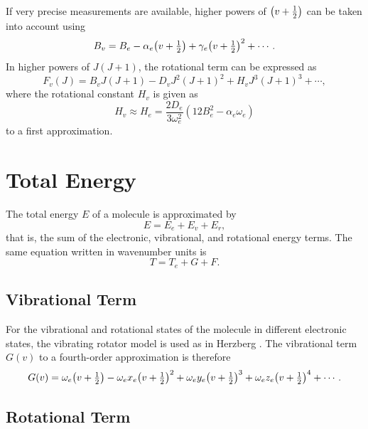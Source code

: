 \documentclass[11pt, twoside, fleqn]{report}
\DeclareRobustCommand\_{\ifmmode\expandafter\subtxt\else\textunderscore\fi}
\DeclarePairedDelimiter\p{\lparen}{\rparen}
\begin{document}
If very precise measurements are available, higher powers of $\p*{v + \tfrac{1}{2}}$ can be taken into account using
\begin{equation*}
    B_v = B_e - \alpha_e\p*{v + \tfrac{1}{2}} + \gamma_e\p*{v + \tfrac{1}{2}}^2 + \dotsb.
\end{equation*}
In higher powers of $J(J + 1)$, the rotational term can be expressed as
\begin{equation*}
    F_v(J) = B_vJ(J + 1) - D_vJ^2(J + 1)^2 + H_vJ^3(J + 1)^3 + \dotsb,
\end{equation*}
where the rotational constant $H_v$ is given as
\begin{equation*}
    H_v \approx H_e = \frac{2D_e}{3\omega_e^2}(12B_e^2 - \alpha_e\omega_e)
\end{equation*}
to a first approximation.

\chapter{Total Energy}
\label{c:total_energy}

The total energy $E$ of a molecule is approximated by
\begin{equation*}
    E = E_e + E_v + E_r,
\end{equation*}
that is, the sum of the electronic, vibrational, and rotational energy terms. The same equation written in wavenumber units is
\begin{equation}
    T = T_e + G + F.
\end{equation}

\section{Vibrational Term}
\label{s:vibrational_term}

For the vibrational and rotational states of the molecule in different electronic states, the vibrating rotator model is used as in Herzberg \cite{herzberg:spectra}. The vibrational term $G(v)$ to a fourth-order approximation is therefore
\begin{equation}
    G(v) = \omega_e\p*{v + \tfrac{1}{2}} - \omega_ex_e\p*{v + \tfrac{1}{2}}^2 + \omega_ey_e\p*{v + \tfrac{1}{2}}^3 + \omega_ez_e\p*{v + \tfrac{1}{2}}^4 + \dotsb.
\end{equation}

\section{Rotational Term}
\label{s:rotational_term}
\end{document}
